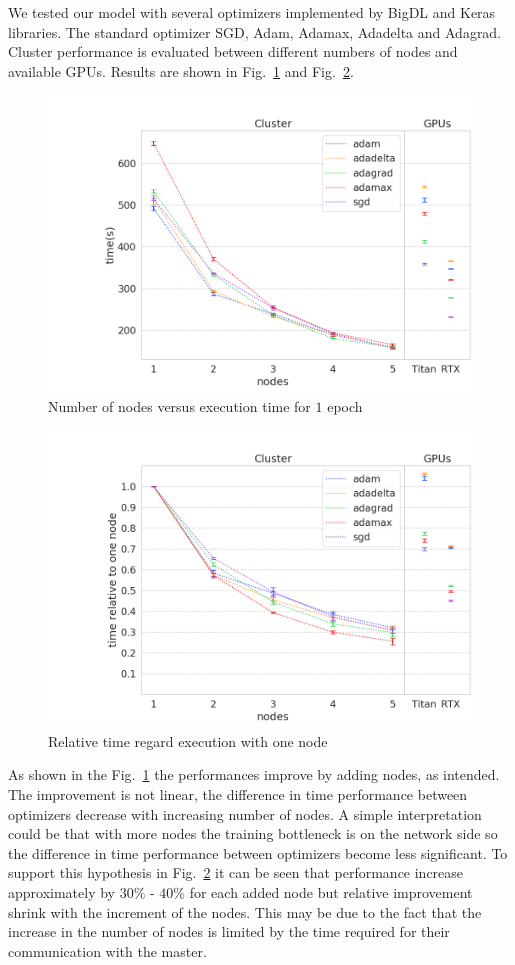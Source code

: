 We tested our model with several optimizers implemented by BigDL and Keras libraries.
The standard optimizer SGD, Adam\cite{Adam}, Adamax\cite{Adam}, Adadelta\cite{Adadelta}
and Adagrad\cite{Adagrad}. Cluster performance is evaluated between different numbers of
nodes and available GPUs. Results are shown in Fig.~\ref{1} and Fig.~\ref{2}.
\begin{figure}[H]
 \includegraphics[scale=0.4]{figures/absolute.png}
 \caption{Number of nodes versus execution time for $1$ epoch}
 \label{1}
\end{figure}
\begin{figure}[H]
 \includegraphics[scale=0.4]{figures/relative.png}
 \caption{Relative time regard execution with one node}
 \label{2}
\end{figure}

As shown in the Fig.~\ref{1} the performances improve by adding nodes, as intended. The
improvement is not linear, the difference in time performance between optimizers decrease
with increasing number of nodes. A simple interpretation could be that with more nodes
the training bottleneck is on the network side so the difference in time performance
between optimizers become less significant.
To support this hypothesis in Fig.~\ref{2} it can be seen that performance increase
approximately by $30\%$ - $40\%$ for each added node but relative improvement shrink
with the increment of the nodes. This may be due to the fact that the increase in the
number of nodes is limited by the time required for their communication with the
master.

